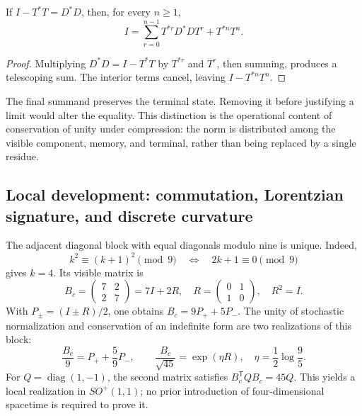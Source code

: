 \begin{proposition}
If \(I-T^*T=D^*D\), then, for every \(n\ge1\),
\begin{equation}
 I=\sum_{r=0}^{n-1}T^{*r}D^*DT^r+T^{*n}T^n.
 \label{eq:telescopia}
\end{equation}
\end{proposition}
\begin{proof}
Multiplying \(D^*D=I-T^*T\) by \(T^{*r}\) and \(T^r\), then summing, produces a telescoping sum. The interior terms cancel, leaving \(I-T^{*n}T^n\).
\end{proof}

The final summand preserves the terminal state. Removing it before justifying a limit would alter the equality. This distinction is the operational content of conservation of unity under compression: the norm is distributed among the visible component, memory, and terminal, rather than being replaced by a single residue.

\subsection{Local development: commutation, Lorentzian signature, and discrete curvature}
\label{vii:sec:bloque-compresion}
\label{iv:extension-curvatura-mixta}

The adjacent diagonal block with equal diagonals modulo nine is unique. Indeed,
\[
 k^2\equiv(k+1)^2\pmod9\quad\Longleftrightarrow\quad2k+1\equiv0\pmod9
\]
gives \(k=4\). Its visible matrix is
\[
 B_c=\begin{pmatrix}7&2\\2&7\end{pmatrix}=7I+2R,
 \quad R=\begin{pmatrix}0&1\\1&0\end{pmatrix},\quad R^2=I.
\]
With \(P_\pm=(I\pm R)/2\), one obtains \(B_c=9P_++5P_-\). The unity of stochastic normalization and conservation of an indefinite form are two realizations of this block:
\[
 \frac{B_c}{9}=P_++\frac59P_-,\qquad
 \frac{B_c}{\sqrt{45}}=\exp(\eta R),\quad\eta=\frac12\log\frac95.
\]
For \(Q=\operatorname{diag}(1,-1)\), the second matrix satisfies \(B_c^{\mathsf T}QB_c=45Q\). This yields a local realization in \(SO^+(1,1)\); no prior introduction of four-dimensional spacetime is required to prove it.


